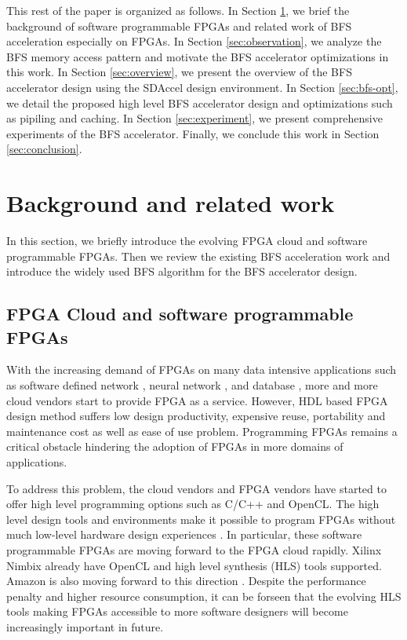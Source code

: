 This rest of the paper is organized as follows. In Section \ref{sec:relatedwork}, 
we brief the background of software programmable FPGAs and related work of 
BFS acceleration especially on FPGAs. In Section \ref{sec:observation},  
we analyze the BFS memory access pattern and motivate the BFS accelerator 
optimizations in this work. In Section \ref{sec:overview}, we present 
the overview of the BFS accelerator design using the SDAccel design environment. 
In Section \ref{sec:bfs-opt}, we detail the proposed high level BFS accelerator 
design and optimizations such as pipiling and caching. 
In Section \ref{sec:experiment}, we present comprehensive experiments of the 
BFS accelerator. Finally, we conclude this work in Section \ref{sec:conclusion}.

\section{Background and related work} \label{sec:relatedwork}
In this section, we briefly introduce the evolving FPGA 
cloud and software programmable FPGAs.
Then we review the existing BFS acceleration work and introduce the widely 
used BFS algorithm for the BFS accelerator design.

\subsection{FPGA Cloud and software programmable FPGAs}
With the increasing demand of FPGAs on many data intensive 
applications such as software defined network 
\cite{zhang2017scalable, li2016clicknp}, neural 
network \cite{Zhao2017accelerating, Zhang2017improving}, 
and database \cite{wang2017relational}, more and more 
cloud vendors start to provide FPGA as a service. However,
HDL based FPGA design method suffers low design productivity, 
expensive reuse, portability and maintenance cost as well 
as ease of use problem. Programming FPGAs remains a critical 
obstacle hindering the adoption of FPGAs in more domains 
of applications. 

To address this problem, the cloud vendors and FPGA vendors have started 
to offer high level programming options such as C/C++ and OpenCL. The high 
level design tools and environments make it possible to program FPGAs 
without much low-level hardware design experiences \cite{nimbix, xilinx-sdaccel, intel-opencl}. 
In particular, these software programmable FPGAs are moving forward to the FPGA cloud
rapidly. Xilinx Nimbix \cite{nimbix} already have OpenCL and high level 
synthesis (HLS) tools supported. Amazon is also moving forward to this 
direction \cite{f1}. Despite the performance penalty and higher resource consumption, 
it can be forseen that the evolving HLS tools \cite{Nane2016hls-survey} making 
FPGAs accessible to more software designers will become increasingly important 
in future.

